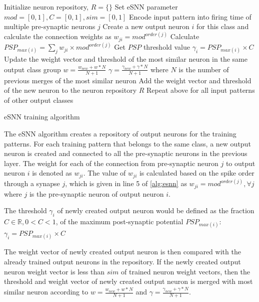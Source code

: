 \begin{algorithm}
	\begin{algorithmic}[1]
		\STATE Initialize neuron repository, $R=\{\}$
		\STATE Set eSNN parameter $mod=[0, 1], C= [0, 1], sim=[0, 1]$
		\STATE Encode input pattern into firing time of multiple pre-synaptic neurons $j$
		\STATE Create a new output neuron $i$ for this class and calculate the connection weights as $w_{ji}=mod^{order(j)}$
		\STATE Calculate $PSP_{max(i)}=\sum_j w_{ji}\times mod^{order(j)}$
		\STATE Get $PSP$ threshold value $\gamma_i = PSP_{max(i)}\times C$
		\STATE Update the weight vector and threshold of the most similar neuron in the same output class group
		\STATE $w=\frac{w_{new}+w*N}{N+1}$
		\STATE $\gamma=\frac{\gamma_{new}+\gamma*N}{N+1}$
		\STATE where $N$ is the number of previous merges of the most similar neuron
		\ELSE
		\STATE Add the weight vector and threshold of the new neuron to the neuron repository $R$
		\ENDIF
		\ENDFOR
		\STATE Repeat above for all input patterns of other output classes
	\end{algorithmic}
	\caption{eSNN training algorithm}
	\label{alg:esnn}
\end{algorithm}

The eSNN algorithm creates a repository of output neurons for the training patterns. For each training pattern that belongs to the same class, a new output neuron is created and connected to all the pre-synaptic neurons in the previous layer. The weight for each of the connection from pre-synaptic neuron $j$ to output neuron $i$ is denoted as $w_{ji}$. The value of $w_{ji}$ is calculated based on the spike order through a synapse $j$, which is given in line 5 of \algorithmname \ref{alg:esnn} as $w_{ji}=mod^{order(j)}, \forall j$ where $j$ is the pre-synaptic neuron of output neuron $i$.

The threshold $\gamma_i$  of newly created output neuron would be defined as the fraction $C \in \mathbb{R},0<C<1$, of the maximum post-synaptic potential $PSP_{max⁡(i)}$: $\gamma_i = PSP_{max(i)}\times C$

The weight vector of newly created output neuron is then compared with the already trained output neurons in the repository. If the newly created output neuron weight vector is less than $sim$ of trained neuron weight vectors, then the threshold and weight vector of newly created output neuron is merged with most similar neuron according to $\displaystyle w=\frac{w_{new}+w*N}{N+1}$ and $\displaystyle \gamma=\frac{\gamma_{new}+\gamma*N}{N+1}$.

